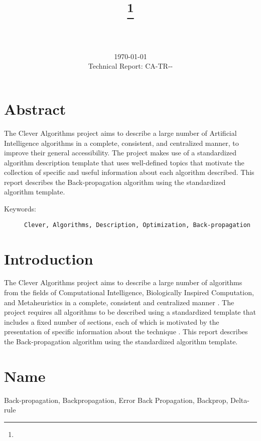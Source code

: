 \documentclass[a4paper, 11pt]{article}
\title{{\myreporttitle}\footnote{\myreportlicense}}
\author{\myreportauthor\\{\myreportemail}\\\small\myreportproject}
\date{\today\\{\small{Technical Report: CA-TR-{\myreportdate}-\myreportversion}}}
\begin{document}
\maketitle

\section*{Abstract} 
The Clever Algorithms project aims to describe a large number of Artificial Intelligence algorithms in a complete, consistent, and centralized manner, to improve their general accessibility. 
The project makes use of a standardized algorithm description template that uses well-defined topics that motivate the collection of specific and useful information about each algorithm described.
This report describes the Back-propagation algorithm using the standardized algorithm template.

\begin{description}
	\item[Keywords:] {\small\texttt{Clever, Algorithms, Description, Optimization, Back-propagation}}
\end{description} 

\section{Introduction} 
\label{sec:intro}
The Clever Algorithms project aims to describe a large number of algorithms from the fields of Computational Intelligence, Biologically Inspired Computation, and Metaheuristics in a complete, consistent and centralized manner \cite{Brownlee2010}.
The project requires all algorithms to be described using a standardized template that includes a fixed number of sections, each of which is motivated by the presentation of specific information about the technique \cite{Brownlee2010a}.
This report describes the Back-propagation algorithm using the standardized algorithm template.

\section{Name} 
\label{sec:name}
Back-propagation, Backpropagation, Error Back Propagation, Backprop, Delta-rule
\end{document}
